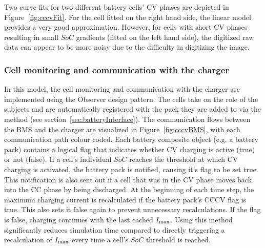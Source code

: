 Two curve fits for two different battery cells' CV phases are depicted in Figure~\ref{fig:cccvFit}. For the cell fitted on the right hand side, the linear model provides a very good approximation. However, for cells with short CV phases resulting in small $SoC$ gradients (fitted on the left hand side), the digitized raw data can appear to be more noisy due to the difficulty in digitizing the image.

\subsubsection{Cell monitoring and communication with the charger}
\label{sec:BMS}
In this model, the cell monitoring and communication with the charger are implemented using the Observer design pattern. The cells take on the role of the subjects and are automatically registered with the pack they are added to via the  method (see section~\ref{sec:batteryInterface}). The communication flows between the BMS and the charger are visualized in Figure~\ref{fig:cccvBMS}, with each communication path colour coded. Each battery composite object (e.g. a battery pack) contains a logical flag that indicates whether CV charging is active (true) or not (false). If a cell's individual $SoC$ reaches the threshold at which CV charging is activated, the battery pack is notified, causing it's flag to be set true. This notification is also sent out if a cell that was in the CV phase moves back into the CC phase by being discharged. At the beginning of each time step, the maximum charging current is recalculated if the battery pack's CCCV flag is true. This also sets it false again to prevent unnecessary recalculations. If the flag is false, charging continues with the last cached $I_\text{max}$. Using this method significantly reduces simulation time compared to directly triggering a recalculation of $I_\text{max}$ every time a cell's $SoC$ threshold is reached.  
